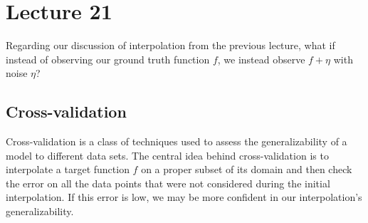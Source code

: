 \chapter{Lecture 21}
Regarding our discussion of interpolation from the previous lecture, what if instead of observing our ground truth function $f$, we instead observe $f + \eta$ with noise $\eta$? 
\section{Cross-validation}
Cross-validation is a class of techniques used to assess the generalizability of a model to different data sets. The central idea behind cross-validation is to interpolate a target function $f$ on a proper subset of its domain and then check the error on all the data points that were not considered during the initial interpolation. If this error is low, we may be more confident in our interpolation's generalizability.

